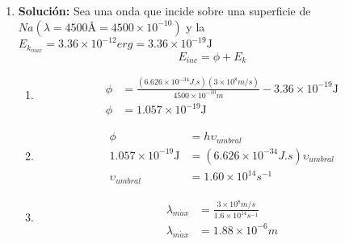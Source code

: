 \documentclass{article}
\begin{document}
\begin{enumerate}
    \item 
    \textbf{Solución:}
    Sea una onda que incide sobre una superficie de $Na (\lambda = 4500 \si{\angstrom} = 4500 \times 10^{-10})$ y la \\
    $E_{k_{max}} = 3.36 \times 10^{-12}erg = 3.36 \times 10^{-19}\si\joule$   %
    $$ E_{inc} = \phi + E_k$$
    \begin{enumerate}
        \item 
        \begin{equation*}
            \begin{split}
                \phi &= \frac{(6.626 \times 10^{-34}J.s)(3 \times 10^{8}m/s)}{4500 \times 10^{-10}m} - 3.36 \times 10^{-19}\si\joule\\
                \phi &= 1.057 \times 10^{-19}\si\joule
            \end{split}
        \end{equation*}

        \item
        \begin{equation*}
            \begin{split}
                \phi &= h\upsilon_{umbral}\\
                1.057 \times 10^{-19}\si\joule &= (6.626 \times 10^{-34}J.s)\upsilon_{umbral}\\
                \upsilon_{umbral} &= 1.60 \times 10^{14}s^{-1}
            \end{split}
        \end{equation*}

        \item
        \begin{equation*}
            \begin{split}
                \lambda_{m\acute{a}x} &= \frac{3 \times 10^{8}m/s}{1.6 \times 10^{14}s^{-1}}\\
                \lambda_{m\acute{a}x} &= 1.88 \times 10^{-6}m 
            \end{split}
        \end{equation*}
    \end{enumerate}



\end{enumerate}
\end{document}
